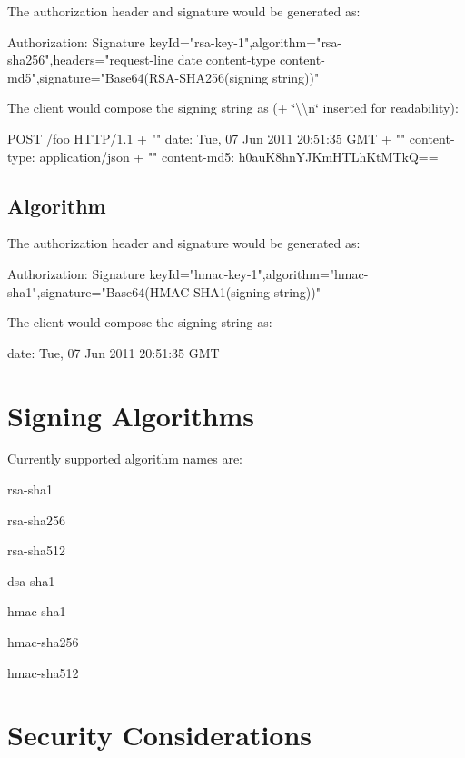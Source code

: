 The authorization header and signature would be generated as\+: \begin{DoxyVerb}Authorization: Signature keyId="rsa-key-1",algorithm="rsa-sha256",headers="request-line date content-type content-md5",signature="Base64(RSA-SHA256(signing string))"
\end{DoxyVerb}


The client would compose the signing string as ({\ttfamily + \char`\"{}\textbackslash{}\textbackslash{}n\char`\"{}} inserted for readability)\+: \begin{DoxyVerb}POST /foo HTTP/1.1 + "\n"
date: Tue, 07 Jun 2011 20:51:35 GMT + "\n"
content-type: application/json + "\n"
content-md5: h0auK8hnYJKmHTLhKtMTkQ==
\end{DoxyVerb}


\subsection*{Algorithm}

The authorization header and signature would be generated as\+: \begin{DoxyVerb}Authorization: Signature keyId="hmac-key-1",algorithm="hmac-sha1",signature="Base64(HMAC-SHA1(signing string))"
\end{DoxyVerb}


The client would compose the signing string as\+: \begin{DoxyVerb}date: Tue, 07 Jun 2011 20:51:35 GMT
\end{DoxyVerb}


\section*{Signing Algorithms}

Currently supported algorithm names are\+:


\begin{DoxyItemize}
\item rsa-\/sha1
\item rsa-\/sha256
\item rsa-\/sha512
\item dsa-\/sha1
\item hmac-\/sha1
\item hmac-\/sha256
\item hmac-\/sha512
\end{DoxyItemize}

\section*{Security Considerations}

